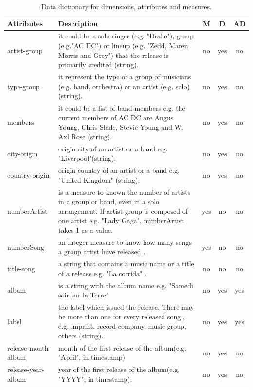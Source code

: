 \documentclass[12pt]{article}
\begin{document}
\begin{table}[h!]
\begin{center}
\begin{tabular}{@{}|l|p{7cm}|c|c|c|@{}} 
\toprule
Attributes & Description & M & D & AD \\ [0.5ex] \midrule
artist-group & it could be a solo singer (e.g. "Drake"), group (e.g."AC DC") or lineup (e.g. "Zedd, Maren Morris and Grey") that the release is primarily credited (string). & no & yes & no \\ \hline
type-group & it represent the type of a group of musicians (e.g. band, orchestra) or an artist (e.g. solo) (string). & no & yes & no \\ \hline
members & it could be a list of band members e.g. the current members of AC DC are Angus Young, Chris Slade, Stevie Young and W. Axl Rose (string). & no & yes & no \\ \bottomrule
city-origin & origin city of an artist or a band e.g. "Liverpool"(string). & no & yes & no \\ \hline
country-origin & origin country of an artist or a band e.g. "United Kingdom" (string).  & no & yes & no \\ \hline
numberArtist & is a measure to known the number of artists in a group or band, even in a solo arrangement. If artist-group is composed of one artist e.g. "Lady Gaga", numberArtist takes 1 as a value. & yes & no & no \\ \hline
numberSong & an integer measure to know how many songs a group artist have released . & yes & no & no \\ \bottomrule \midrule
title-song & a string that contains a music name or a title of a release e.g. "La corrida" . & no & no & no \\ \hline
album & is a string with the album name e.g. "Samedi soir sur la Terre" & no & yes & yes \\ \hline
label & the label which issued the release. There may be more than one for every released song , e.g. imprint, record company, music group, others (string). & no & yes & yes \\ \hline
release-month-album & month of the first release of the album(e.g. "April", in timestamp)  & no & yes & no \\ \hline
release-year-album & year of the first release of the album(e.g. "YYYY", in timestamp). & no & yes & no \\ \bottomrule \midrule
\end{tabular}
\caption{Data dictionary for dimensions, attributes and measures.}
\label{table:2}
\end{center}
\end{table}
\end{document}
